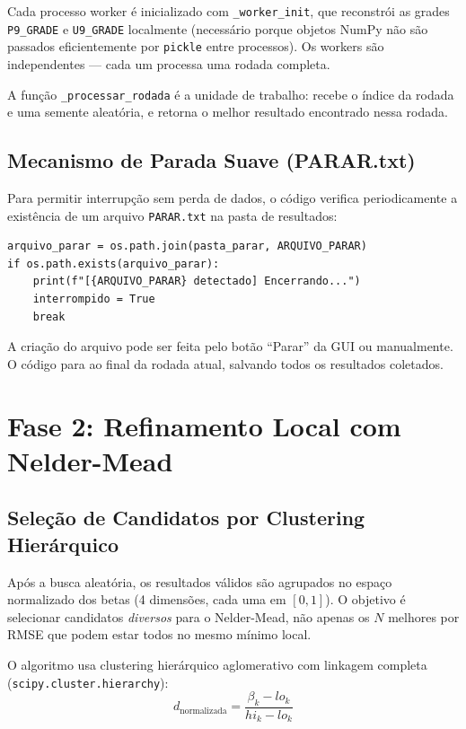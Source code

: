 \documentclass[12pt,a4paper]{report}
\newcommand{\code}[1]{\texttt{#1}}
\begin{document}
Cada processo worker é inicializado com \code{\_worker\_init}, que
reconstrói as grades \code{P9\_GRADE} e \code{U9\_GRADE} localmente
(necessário porque objetos NumPy não são passados eficientemente por
\texttt{pickle} entre processos). Os workers são independentes —
cada um processa uma rodada completa.

A função \code{\_processar\_rodada} é a unidade de trabalho: recebe
o índice da rodada e uma semente aleatória, e retorna o melhor
resultado encontrado nessa rodada.

\subsection{Mecanismo de Parada Suave (PARAR.txt)}

Para permitir interrupção sem perda de dados, o código verifica
periodicamente a existência de um arquivo \code{PARAR.txt} na pasta
de resultados:

\begin{lstlisting}[caption={Verificação de arquivo PARAR.txt}]
arquivo_parar = os.path.join(pasta_parar, ARQUIVO_PARAR)
if os.path.exists(arquivo_parar):
    print(f"[{ARQUIVO_PARAR} detectado] Encerrando...")
    interrompido = True
    break
\end{lstlisting}

A criação do arquivo pode ser feita pelo botão ``Parar'' da GUI
ou manualmente. O código para ao final da rodada atual, salvando
todos os resultados coletados.

\section{Fase 2: Refinamento Local com Nelder-Mead}

\subsection{Seleção de Candidatos por Clustering Hierárquico}

Após a busca aleatória, os resultados válidos são agrupados no espaço
normalizado dos betas (4 dimensões, cada uma em $[0, 1]$). O objetivo
é selecionar candidatos \emph{diversos} para o Nelder-Mead, não apenas
os $N$ melhores por RMSE que podem estar todos no mesmo mínimo local.

O algoritmo usa clustering hierárquico aglomerativo com linkagem completa
(\texttt{scipy.cluster.hierarchy}):
\[
  d_{\text{normalizada}} = \frac{\beta_k - lo_k}{hi_k - lo_k}
\]
\end{document}

